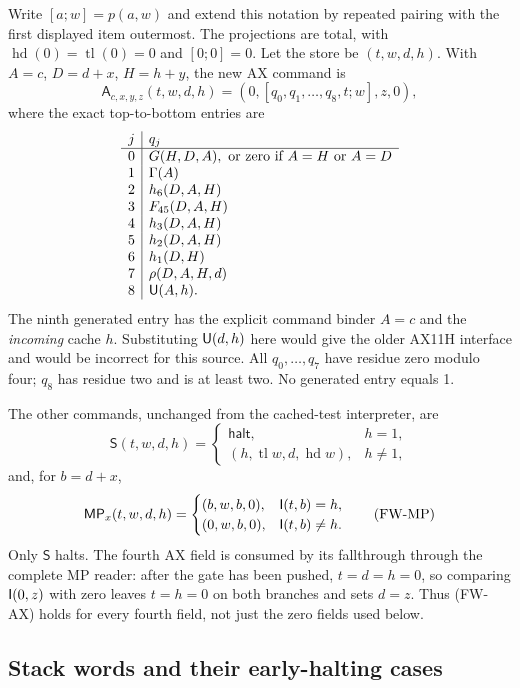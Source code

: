 Write $[a;w]=p(a,w)$ and extend this notation by repeated pairing with
the first displayed item outermost.  The projections are total, with
$\operatorname{hd}(0)=\operatorname{tl}(0)=0$ and $[0;0]=0$.
Let the store be $(t,w,d,h)$.  With $A=c$, $D=d+x$, $H=h+y$, the new
AX command is
\[
 \mathsf A_{c,x,y,z}(t,w,d,h)
       =(0,[q_0,q_1,\ldots,q_8,t;w],z,0),               \tag{FW-AX}
\]
where the exact top-to-bottom entries are
\[
\begin{array}{c|l}
 j&q_j\\\hline
 0&G(H,D,A),\text{ or zero if }A=H\text{ or }A=D\\
 1&\Gamma(A)\\
 2&h_6(D,A,H)\\
 3&F_{45}(D,A,H)\\
 4&h_3(D,A,H)\\
 5&h_2(D,A,H)\\
 6&h_1(D,H)\\
 7&\rho(D,A,H,d)\\
 8&\mathsf U(A,h).
\end{array}
\]
The ninth generated entry has the explicit command binder $A=c$ and
the \emph{incoming} cache $h$.  Substituting $\mathsf U(d,h)$ here would
give the older AX11H interface and would be incorrect for this source.
All $q_0,\ldots,q_7$ have residue zero modulo four; $q_8$ has residue
two and is at least two.  No generated entry equals 1.

The other commands, unchanged from the cached-test interpreter, are
\[
 \mathsf S(t,w,d,h)=
 \begin{cases}\mathsf{halt},&h=1,\\
 (h,\operatorname{tl}w,d,\operatorname{hd}w),&h\ne1,
 \end{cases}                                             \tag{FW-S}
\]
and, for $b=d+x$,
\[
 \mathsf{MP}_x(t,w,d,h)=
 \begin{cases}(b,w,b,0),&\mathsf I(t,b)=h,\\
 (0,w,b,0),&\mathsf I(t,b)\ne h.
 \end{cases}                                             \tag{FW-MP}
\]
Only $\mathsf S$ halts.  The fourth AX field is consumed by its
fallthrough through the complete MP reader: after the gate has been
pushed, $t=d=h=0$, so comparing $\mathsf I(0,z)$ with zero leaves $t=h=0$
on both branches and sets $d=z$.  Thus (FW-AX) holds for every fourth
field, not just the zero fields used below.

\subsection{Stack words and their early-halting cases}

